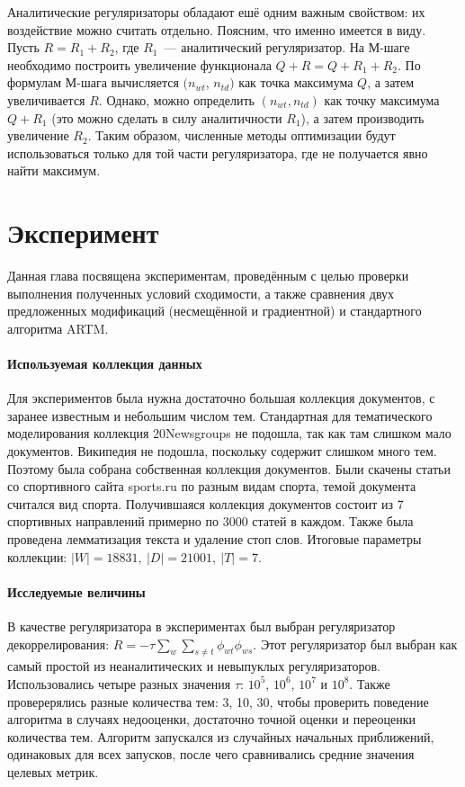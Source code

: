 \documentclass[12pt, twoside]{article}
\begin{document}
Аналитические регуляризаторы  обладают ешё одним важным свойством: их воздействие можно считать отдельно. Поясним, что именно имеется в виду. Пусть $R = R_1 + R_2$, где $R_1$~--- аналитический регуляризатор. На М-шаге необходимо построить увеличение функционала $Q + R = Q +  R_1 +  R_2$. По формулам М-шага вычисляется $(n_{wt}$, $n_{td})$ как точка максимума $Q$, а затем увеличивается $R$.  Однако, можно определить $(n_{wt},n_{td})$ как точку максимума $Q + R_1 $ (это можно сделать в силу аналитичности $R_1$), а затем производить увеличение $R_2$. Таким образом,  численные методы оптимизации будут использоваться только для той части регуляризатора, где не получается явно найти максимум.

	\section{Эксперимент}
Данная глава посвящена экспериментам, проведённым с целью проверки выполнения полученных условий сходимости, а также сравнения двух предложенных модификаций (несмещённой и градиентной) и стандартного алгоритма ARTM. 
\paragraph{Используемая коллекция данных}
Для экспериментов была нужна достаточно большая коллекция документов, с заранее известным  и небольшим числом тем. Стандартная для тематического моделирования  коллекция 20Newsgroups не подошла, так как там слишком мало документов. Википедия не подошла, поскольку содержит слишком много тем. Поэтому была собрана собственная коллекция документов. Были скачены статьи со спортивного сайта sports.ru по разным видам спорта, темой документа считался вид спорта. Получившаяся коллекция документов состоит из 7 спортивных направлений примерно по 3000 статей в каждом. Также была проведена лемматизация текста и удаление стоп слов. Итоговые параметры коллекции: $|W| = 18831,~|D| = 21001,~|T| = 7$.
\paragraph{Исследуемые величины}
В качестве регуляризатора в экспериментах был выбран регуляризатор декоррелирования: $R = - \tau \sum_w \sum_{s \neq t} \phi_{wt} \phi_{ws}$. Этот регуляризатор был выбран как самый простой из неаналитических и невыпуклых регуляризаторов. Использовались четыре разных значения $\tau$: $10^5$, $10^6$, $10^7$ и $10^8$. Также проверерялись разные количества тем: 3, 10, 30, чтобы проверить поведение алгоритма в случаях недооценки, достаточно точной оценки и переоценки  количества тем. Алгоритм  запускался из случайных начальных приближений, одинаковых для всех запусков, после чего сравнивались средние значения целевых метрик.
\end{document}
